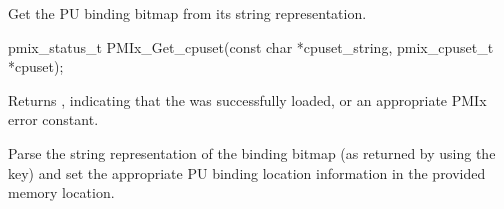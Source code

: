 Get the \ac{PU} binding bitmap from its string representation.

\format

\cspecificstart
\begin{codepar}
pmix_status_t
PMIx_Get_cpuset(const char *cpuset_string,
                pmix_cpuset_t *cpuset);
\end{codepar}
\cspecificend

\begin{arglist}
\end{arglist}

Returns , indicating that the  was successfully loaded, or an appropriate \ac{PMIx} error constant.

\descr

Parse the string representation of the binding bitmap (as returned by  using the  key) and set the appropriate \ac{PU} binding location information in the provided memory location.

